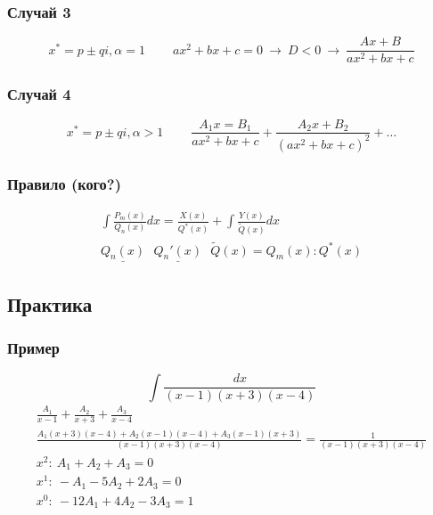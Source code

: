 \documentclass{article}
\begin{document}
\subsubsection{Случай 3}
\[
    x^* = p \pm qi, \alpha = 1 ~~~~~~~~~~
    ax^2 + bx + c = 0 ~\rightarrow~ D < 0 ~\rightarrow~ \frac{Ax + B}{ax^2 + bx + c}
\]
\subsubsection{Случай 4}
\[
    x^* = p \pm qi, \alpha > 1 ~~~~~~~~~~
    \frac{A_1x = B_1}{ax^2 + bx + c} + \frac{A_2x + B_2}{(ax^2 + bx + c)^2} + \dots
\]
\subsubsection{Правило (кого?)}
\begin{gather*}
    \int \frac{P_m(x)}{Q_n(x)} dx = \frac{X(x)}{Q^*(x)} + \int \frac{Y(x)}{\widetilde{Q}(x)} dx \\
    \underline{Q_n(x)} ~~~ \underline{Q_n'(x)} ~~~ \widetilde{Q}(x) = Q_m(x): Q^*(x)
\end{gather*}



\subsection{Практика}

\subsubsection{Пример}
\[
    \int \frac{dx}{(x - 1)(x + 3)(x - 4)}
\]
\begin{gather*}
    \frac{A_1}{x - 1} + \frac{A_2}{x + 3} + \frac{A_3}{x - 4} \\
    \frac{A_1(x + 3)(x - 4) + A_2(x - 1)(x - 4) + A_3(x - 1)(x + 3)}{(x - 1)(x + 3)(x - 4)} = 
    \frac{1}{(x - 1)(x + 3)(x - 4)} \\
    x^2:~    A_1 +  A_2 +  A_3 = 0 \\
    x^1:~   -A_1 - 5A_2 + 2A_3 = 0 \\
    x^0:~ -12A_1 + 4A_2 - 3A_3 = 1 \\
\end{gather*}
\end{document}
